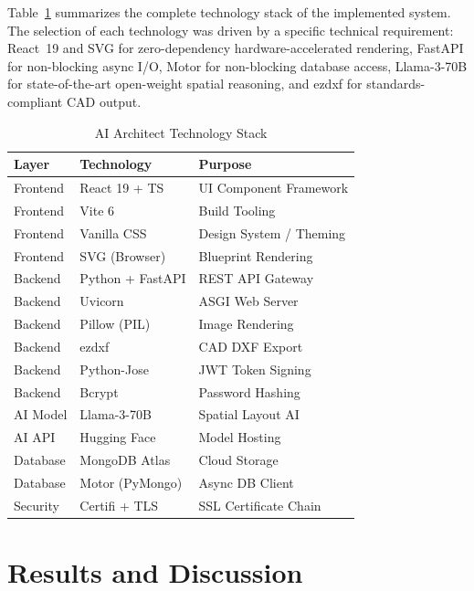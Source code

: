 \documentclass[10pt, twocolumn, letterpaper]{article}
\begin{document}
Table~\ref{tab:stack} summarizes the complete technology stack of the
implemented system. The selection of each technology was driven by a
specific technical requirement: React~19 and SVG for zero-dependency
hardware-accelerated rendering, FastAPI for non-blocking async I/O,
Motor for non-blocking database access, Llama-3-70B for state-of-the-art
open-weight spatial reasoning, and ezdxf for standards-compliant CAD output.

\begin{table}[ht]
\caption{AI Architect Technology Stack}
\label{tab:stack}
\centering
\fontsize{8}{10}\selectfont
\renewcommand{\arraystretch}{1.2}
\begin{tabular}{@{}lll@{}}
\toprule
\textbf{Layer} & \textbf{Technology} & \textbf{Purpose} \\
\midrule
Frontend  & React 19 + TS    & UI Component Framework \\
Frontend  & Vite 6           & Build Tooling \\
Frontend  & Vanilla CSS      & Design System / Theming \\
Frontend  & SVG (Browser)    & Blueprint Rendering \\
Backend   & Python + FastAPI & REST API Gateway \\
Backend   & Uvicorn          & ASGI Web Server \\
Backend   & Pillow (PIL)     & Image Rendering \\
Backend   & ezdxf            & CAD DXF Export \\
Backend   & Python-Jose      & JWT Token Signing \\
Backend   & Bcrypt           & Password Hashing \\
AI Model  & Llama-3-70B      & Spatial Layout AI \\
AI API    & Hugging Face     & Model Hosting \\
Database  & MongoDB Atlas    & Cloud Storage \\
Database  & Motor (PyMongo)  & Async DB Client \\
Security  & Certifi + TLS    & SSL Certificate Chain \\
\bottomrule
\end{tabular}
\end{table}

\section{Results and Discussion}
\end{document}
